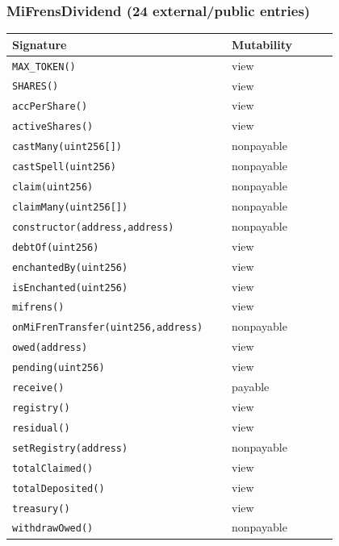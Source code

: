 \subsubsection*{MiFrensDividend \;\normalfont\small(24 external/public entries)}
\begin{longtable}{@{}p{0.62\linewidth}p{0.30\linewidth}@{}}
\toprule \textbf{Signature} & \textbf{Mutability} \\ \midrule \endhead
\texttt{\scriptsize MAX\_TOKEN()} & view \\
\texttt{\scriptsize SHARES()} & view \\
\texttt{\scriptsize accPerShare()} & view \\
\texttt{\scriptsize activeShares()} & view \\
\texttt{\scriptsize castMany(uint256[])} & nonpayable \\
\texttt{\scriptsize castSpell(uint256)} & nonpayable \\
\texttt{\scriptsize claim(uint256)} & nonpayable \\
\texttt{\scriptsize claimMany(uint256[])} & nonpayable \\
\texttt{\scriptsize constructor(address,address)} & nonpayable \\
\texttt{\scriptsize debtOf(uint256)} & view \\
\texttt{\scriptsize enchantedBy(uint256)} & view \\
\texttt{\scriptsize isEnchanted(uint256)} & view \\
\texttt{\scriptsize mifrens()} & view \\
\texttt{\scriptsize onMiFrenTransfer(uint256,address)} & nonpayable \\
\texttt{\scriptsize owed(address)} & view \\
\texttt{\scriptsize pending(uint256)} & view \\
\texttt{\scriptsize receive()} & payable \\
\texttt{\scriptsize registry()} & view \\
\texttt{\scriptsize residual()} & view \\
\texttt{\scriptsize setRegistry(address)} & nonpayable \\
\texttt{\scriptsize totalClaimed()} & view \\
\texttt{\scriptsize totalDeposited()} & view \\
\texttt{\scriptsize treasury()} & view \\
\texttt{\scriptsize withdrawOwed()} & nonpayable \\
\bottomrule\end{longtable}

